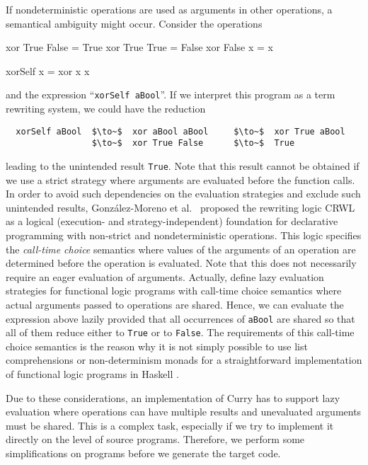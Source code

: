 \documentclass{llncs}
\newcommand{\code}[1]{\mbox{\small\texttt{#1}}}
\newcommand{\ccode}[1]{``\code{#1}''}
\begin{document}
If nondeterministic operations are used as arguments in other operations,
a semantical ambiguity might occur. Consider the operations
%
\begin{curry}
  xor True  False = True
  xor True  True  = False
  xor False x     = x

  xorSelf x = xor x x
\end{curry}
%
and the expression \ccode{xorSelf aBool}.
If we interpret this program as a term rewriting system,
we could have the reduction
\begin{lstlisting}
  xorSelf aBool  $\to~$  xor aBool aBool     $\to~$  xor True aBool
                 $\to~$  xor True False      $\to~$  True
\end{lstlisting}
leading to the unintended result \code{True}.
Note that this result cannot be obtained if we use a strict strategy
where arguments are evaluated before the function calls.
In order to avoid such dependencies on the evaluation strategies
and exclude such unintended results,
Gonz\'alez-Moreno et al.\ \cite{GonzalezEtAl99} proposed
the rewriting logic CRWL as a logical
(execution- and strategy-independent) foundation for declarative
programming with non-strict and nondeterministic operations.  This
logic specifies the \emph{call-time choice} semantics \cite{Hussmann92}
\label{ctc-semantics}
where values of the arguments of an operation are determined before the
operation is evaluated. Note that this does not necessarily require
an eager evaluation of arguments.
Actually, \cite{AlbertHanusHuchOliverVidal05,LopezRodriguezSanchez07}
define lazy evaluation strategies for functional logic programs
with call-time choice semantics where actual arguments passed to
operations are shared. Hence, we can evaluate the expression above
lazily provided that all occurrences of \code{aBool}
are shared so that all of them reduce either to \code{True} or to \code{False}.
The requirements of this call-time choice semantics is the
reason why it is not simply possible to use list comprehensions
or non-determinism monads for a straightforward implementation
of functional logic programs in Haskell \cite{FischerKiselyovShan09}.

Due to these considerations, an implementation of Curry
has to support lazy evaluation where operations can have multiple results
and unevaluated arguments must be shared.
This is a complex task, especially if we try to implement it directly
on the level of source programs. Therefore, we perform some
simplifications on programs before we generate the target code.
\end{document}
